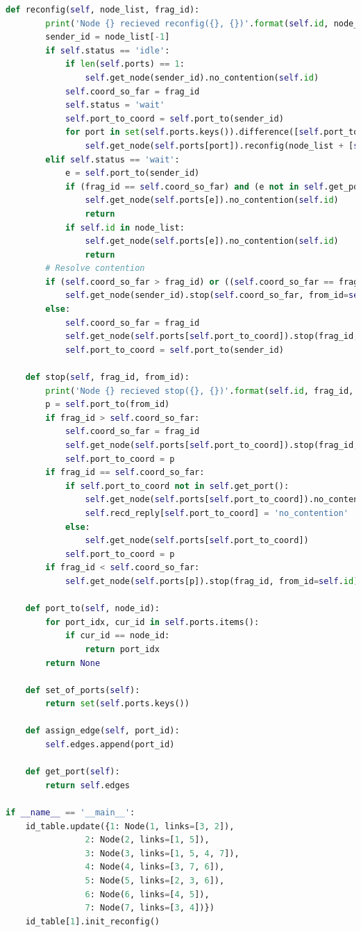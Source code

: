 \documentclass[a4paper,12pt]{article}
\newcommand{\<}{\langle}
\renewcommand{\>}{\rangle}
\theoremstyle{definition}
\begin{document}
\begin{lstlisting}[language=python, caption={Color quantization program}, label={main_1}, basicstyle=\small]
    def reconfig(self, node_list, frag_id):
        print('Node {} recieved reconfig({}, {})'.format(self.id, node_list, frag_id))
        sender_id = node_list[-1]
        if self.status == 'idle':
            if len(self.ports) == 1:
                self.get_node(sender_id).no_contention(self.id)
            self.coord_so_far = frag_id
            self.status = 'wait'
            self.port_to_coord = self.port_to(sender_id)
            for port in set(self.ports.keys()).difference([self.port_to(sender_id)]):
                self.get_node(self.ports[port]).reconfig(node_list + [self.id], frag_id)
        elif self.status == 'wait':
            e = self.port_to(sender_id)
            if (frag_id == self.coord_so_far) and (e not in self.get_port()):
                self.get_node(self.ports[e]).no_contention(self.id)
                return
            if self.id in node_list:
                self.get_node(self.ports[e]).no_contention(self.id)
                return
        # Resolve contention
        if (self.coord_so_far > frag_id) or ((self.coord_so_far == frag_id) and (self.id > sender_id)):
            self.get_node(sender_id).stop(self.coord_so_far, from_id=self.id)
        else:
            self.coord_so_far = frag_id
            self.get_node(self.ports[self.port_to_coord]).stop(frag_id, from_id=self.id)
            self.port_to_coord = self.port_to(sender_id)

    def stop(self, frag_id, from_id):
        print('Node {} recieved stop({}, {})'.format(self.id, frag_id, from_id))
        p = self.port_to(from_id)
        if frag_id > self.coord_so_far:
            self.coord_so_far = frag_id
            self.get_node(self.ports[self.port_to_coord]).stop(frag_id, from_id=self.id)
            self.port_to_coord = p
        if frag_id == self.coord_so_far:
            if self.port_to_coord not in self.get_port():
                self.get_node(self.ports[self.port_to_coord]).no_contention(self.id)
                self.recd_reply[self.port_to_coord] = 'no_contention'
            else:
                self.get_node(self.ports[self.port_to_coord])
            self.port_to_coord = p
        if frag_id < self.coord_so_far:
            self.get_node(self.ports[p]).stop(frag_id, from_id=self.id)

    def port_to(self, node_id):
        for port_idx, cur_id in self.ports.items():
            if cur_id == node_id:
                return port_idx
        return None

    def set_of_ports(self):
        return set(self.ports.keys())

    def assign_edge(self, port_id):
        self.edges.append(port_id)

    def get_port(self):
        return self.edges

if __name__ == '__main__':
    id_table.update({1: Node(1, links=[3, 2]),
                2: Node(2, links=[1, 5]),
                3: Node(3, links=[1, 5, 4, 7]),
                4: Node(4, links=[3, 7, 6]),
                5: Node(5, links=[2, 3, 6]),
                6: Node(6, links=[4, 5]),
                7: Node(7, links=[3, 4])})
    id_table[1].init_reconfig()
\end{lstlisting}
\end{document}
